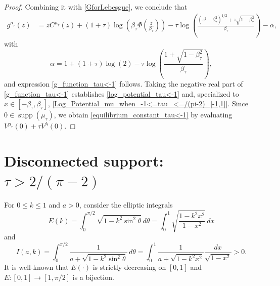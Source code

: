 \documentclass[reqno,11pt]{amsart}
\theoremstyle{plain}
\theoremstyle{definition}
\theoremstyle{remark}
\numberwithin{equation}{section}
\DeclareMathOperator{\supp}{supp}
\begin{document}
\begin{proof}
Combining it with \eqref{GforLebesgue}, we conclude that
\begin{align*}
    g^{\mu_\tau}(z)&=zC^{\mu_\tau}(z)+(1+\tau)\log\left(\beta_\tau\Phi\left(\frac{z}{\beta_\tau}\right)\right)-\tau\log\left(\frac{(z^2-\beta_\tau^2)^{1/2}+z\sqrt{1-\beta_\tau^2}}{\beta_\tau}\right)-\alpha,
\end{align*}
with
$$
\alpha=1+(1+\tau)\log(2)-\tau\log\left(\frac{1+\sqrt{1-\beta_\tau^2}}{\beta_\tau}\right),
$$
and expression \eqref{g_function_tau<-1} follows. Taking the negative real part of \eqref{g_function_tau<-1} establishes \eqref{log_potential_tau<-1} and, specialized to $x\in [-\beta_\tau, \beta_\tau]$, \eqref{Log_Potential_mu_when_-1<=tau_<=/(pi-2)_[-1,1]}. Since $0\in\supp(\mu_\tau)$, we obtain \eqref{equilibrium_constant_tau<-1} by evaluating $V^{\mu_\tau}(0)+\tau V^\lambda(0)$.
\end{proof}


\section{Disconnected support: \texorpdfstring{$\tau>2/(\pi-2)$}{\tau>2/()}} \label{sec:case3}

For $0\le k\le 1$ and $a>0$, consider the elliptic integrals
\begin{equation*}\label{complete_elliptic_integral_of_2nd_kind}
        E(k)=\int_0^{\pi/2}\sqrt{1-k^2\sin^2\theta}\, d\theta = \int_0^1 \sqrt{\frac{1-k^2 x^2}{1-x^2}}\, dx
    \end{equation*}
and
\begin{equation}\label{elliptic_integral_I}
        I(a,k)=\int_0^{\pi/2}\frac{1}{a+\sqrt{1-k^2\sin^2\theta}}\, d\theta = 
        \int_0^1 \frac{1}{a+\sqrt{1-k^2 x^2}} 
        \frac{dx}{\sqrt{1-x^2}}>0 .
    \end{equation}
It is well-known that $E(\cdot)$ is strictly decreasing on $[0,1]$ and $E:[0,1] \to [1,\pi/2]$ is a bijection. 
\end{document}
